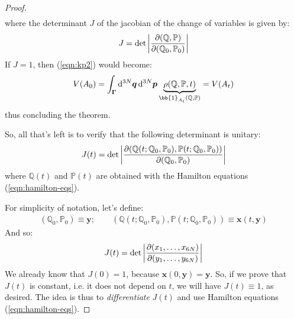 \documentclass[../../main.tex]{subfiles}
\begin{document}
\begin{proof}
\begin{align*}
    \end{align*}
    where the determinant $J$ of the jacobian of the change of variables is given by:
    \begin{align*}
        J = \operatorname{det}\left| \pdv{(\mathbb{Q}, \mathbb{P})}{(\mathbb{Q}_0, \mathbb{P}_0)}\right|
    \end{align*}
    If $J = 1$, then (\ref{eqn:kp2}) would become:
    \begin{align*}
        V(A_0) = \int_{\bm{\Gamma}} \dd[3N]{\bm{q}} \dd[3N]{\bm{p}} \underbrace{\rho(\mathbb{Q}, \mathbb{P}, t)}_{\bb{1}_{A_t}(\mathbb{Q}, \mathbb{P})} = V(A_t)
    \end{align*} 
    thus concluding the theorem.

    \medskip

    So, all that's left is to verify that the following determinant is unitary:
    \begin{align*}
        J(t) = \operatorname{det}\left| \pdv{(\mathbb{Q}(t; \mathbb{Q}_0, \mathbb{P}_0), \mathbb{P}(t; \mathbb{Q}_0, \mathbb{P}_0))}{(\mathbb{Q}_0, \mathbb{P}_0)}\right|
    \end{align*}
    where $\mathbb{Q}(t)$ and $\mathbb{P}(t)$ are obtained with the Hamilton equations (\ref{eqn:hamilton-eqs}). 

    \medskip

    For simplicity of notation, let's define:
    \begin{align}\label{eqn:simplicity-not}
        (\mathbb{Q}_0, \mathbb{P}_0) \equiv \bm{y}; \qquad (\mathbb{Q}(t; \mathbb{Q}_0, \mathbb{P}_0), \mathbb{P}(t; \mathbb{Q}_0, \mathbb{P}_0)) \equiv \bm{x}(t, \bm{y})
    \end{align}
    And so:
    \begin{align*}
        J(t) = \operatorname{det}\left| \pdv{(x_1,\dots, x_{6N})}{(y_1, \dots, y_{6N})}\right|
    \end{align*}
    We already know that $J(0) = 1$, because $\bm{x}(0,\bm{y}) = \bm{y}$. So, if we prove that $J(t)$ is constant, i.e. it does not depend on $t$, we will have $J(t) \equiv 1$, as desired. The idea is thus to \textit{differentiate} $J(t)$ and use Hamilton equations (\ref{eqn:hamilton-eqs}).
    
    \medskip


\end{proof}
\end{document}
